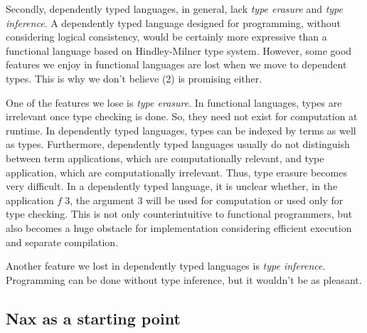 Secondly, dependently typed languages, in general, lack \emph{type erasure}
and \emph{type inference}. A dependently typed language designed for
programming, without considering logical consistency, would be certainly
more expressive than a functional language based on Hindley-Milner type system.
However, some good features we enjoy in functional languages are lost when we
move to dependent types. This is why we don't believe (2) is promising either.

One of the features we lose is \emph{type erasure}. In functional languages,
types are irrelevant once type checking is done. So, they need not exist for
computation at runtime. In dependently typed languages, types can be indexed
by terms as well as types. Furthermore, dependently typed languages usually
do not distinguish between term applications, which are computationally
relevant, and type application, which are computationally irrelevant.
Thus, type erasure becomes very difficult. In a dependently typed language,
it is unclear whether, in the application $f\;3$, the argument $3$ will be
used for computation or used only for type checking.
This is not only counterintuitive to functional programmers, but also becomes
a huge obstacle for implementation considering efficient execution and
separate compilation.

Another feature we lost in dependently typed languages is
\emph{type inference}. Programming can be done without type inference,
but it wouldn't be as pleasant.

\subsection{Nax as a starting point}

